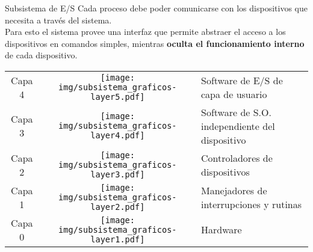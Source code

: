 \documentclass[aspectratio=169]{beamer}
\begin{document}
\begin{frame}{Subsistema de E/S}
    Cada proceso debe poder comunicarse con los dispositivos que necesita a través del sistema.\\
    \medskip
    Para esto el sistema provee una interfaz que permite abstraer el acceso a los dispositivos en comandos simples, mientras \textbf{oculta el funcionamiento interno} de cada dispositivo.\\
    \medskip
    \begin{center}
    \large
    \begin{tabular}{ccl}  \cline{3-3}
    \textcolor{naranjauca}{Capa 4} & \texttt{[image: img/subsistema\_graficos-layer5.pdf]} & Software de E/S de capa de usuario \vspace{0.3cm}\\ \cline{3-3}
    \textcolor{naranjauca}{Capa 3} & \texttt{[image: img/subsistema\_graficos-layer4.pdf]} & Software de S.O. independiente del dispositivo \vspace{0.3cm}\\ \cline{3-3}
    \textcolor{naranjauca}{Capa 2} & \texttt{[image: img/subsistema\_graficos-layer3.pdf]} & Controladores de dispositivos \vspace{0.3cm}\\ \cline{3-3}
    \textcolor{naranjauca}{Capa 1} & \texttt{[image: img/subsistema\_graficos-layer2.pdf]} & Manejadores de interrupciones y rutinas \vspace{0.3cm}\\ \cline{3-3}
    \textcolor{naranjauca}{Capa 0} & \texttt{[image: img/subsistema\_graficos-layer1.pdf]} & Hardware \vspace{0.3cm}\\ \cline{3-3}
    \end{tabular}
    \end{center}
\end{frame}
\end{document}
